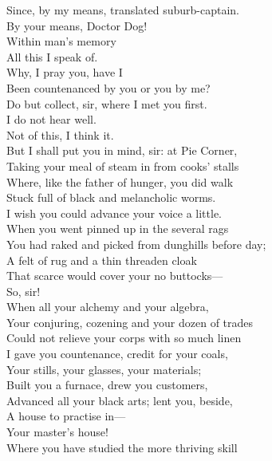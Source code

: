 \documentclass[a4paper,oneside,12pt]{memoir}
\begin{document}
\begin{drama*}
\subtlespeaks Since, by my means, translated suburb-captain.\\
\facespeaks By your means, Doctor Dog!\\
\subtlespeaks {} Within man's memory\\
All this I speak of.\\
\facespeaks {} Why, I pray you, have I\\
Been countenanced by you or you by me?\\
Do but collect, sir, where I met you first.\\
\subtlespeaks I do not hear well.\\
\facespeaks {} Not of this, I think it.\\
But I shall put you in mind, sir: at Pie Corner,\\
Taking your meal of steam in from cooks' stalls\\
Where, like the father of hunger, you did walk\\
Stuck full of black and melancholic worms.\\
\subtlespeaks I wish you could advance your voice a little.\\
\facespeaks When you went pinned up in the several rags\\
You had raked and picked from dunghills before day;\\
A felt of rug and a thin threaden cloak\\
That scarce would cover your no buttocks---\\
\subtlespeaks {} So, sir!\\
\facespeaks When all your alchemy and your algebra,\\
Your conjuring, cozening and your dozen of trades\\
Could not relieve your corps with so much linen\\
I gave you countenance, credit for your coals,\\
Your stills, your glasses, your materials;\\
Built you a furnace, drew you customers,\\
Advanced all your black arts; lent you, beside,\\
A house to practise in---\\
\subtlespeaks {} Your master's house!\\
\facespeaks Where you have studied the more thriving skill\\

\end{drama*}
\end{document}
